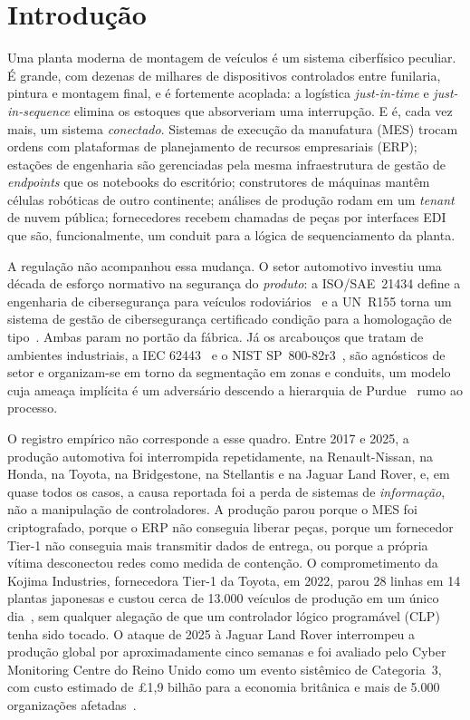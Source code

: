 
\section{Introdução}

Uma planta moderna de montagem de veículos é um sistema ciberfísico peculiar.
É grande, com dezenas de milhares de dispositivos controlados entre funilaria,
pintura e montagem final, e é fortemente acoplada: a logística
\emph{just-in-time} e \emph{just-in-sequence} elimina os estoques que
absorveriam uma interrupção. E é, cada vez mais, um sistema \emph{conectado}.
Sistemas de execução da manufatura (MES) trocam ordens com plataformas de
planejamento de recursos empresariais (ERP); estações de engenharia são
gerenciadas pela mesma infraestrutura de gestão de \emph{endpoints} que os
notebooks do escritório; construtores de máquinas mantêm células robóticas de
outro continente; análises de produção rodam em um \emph{tenant} de nuvem
pública; fornecedores recebem chamadas de peças por interfaces EDI que são,
funcionalmente, um conduit para a lógica de sequenciamento da planta.

A regulação não acompanhou essa mudança. O setor automotivo investiu uma década
de esforço normativo na segurança do \emph{produto}: a ISO/SAE~21434 define a
engenharia de cibersegurança para veículos rodoviários~\cite{isosae21434} e a
UN~R155 torna um sistema de gestão de cibersegurança certificado condição para
a homologação de tipo~\cite{unr155}. Ambas param no portão da fábrica. Já os
arcabouços que tratam de ambientes industriais, a IEC 62443~\cite{iec624433302020,iec624433303} e o
NIST SP~800-82r3~\cite{nist80082r3}, são agnósticos de setor e organizam-se em
torno da segmentação em zonas e conduits, um modelo cuja ameaça implícita é um
adversário descendo a hierarquia de Purdue~\cite{williams1994purdue} rumo ao
processo.

O registro empírico não corresponde a esse quadro. Entre 2017 e 2025, a
produção automotiva foi interrompida repetidamente, na Renault-Nissan, na Honda, na Toyota, na
Bridgestone, na Stellantis e na Jaguar Land Rover, e, em quase todos os casos, a causa reportada foi a perda de sistemas de
\emph{informação}, não a manipulação de controladores. A produção parou porque
o MES foi criptografado, porque o ERP não conseguia liberar peças, porque um
fornecedor Tier-1 não conseguia mais transmitir dados de entrega, ou porque a
própria vítima desconectou redes como medida de contenção. O comprometimento da
Kojima Industries, fornecedora Tier-1 da Toyota, em 2022, parou 28 linhas em 14
plantas japonesas e custou cerca de 13.000 veículos de produção em um único
dia~\cite{inc04toyota,inc04infosec}, sem qualquer alegação de que um controlador
lógico programável (CLP) tenha sido tocado. O ataque de 2025 à Jaguar Land
Rover interrompeu a produção global por aproximadamente cinco semanas e foi
avaliado pelo Cyber Monitoring Centre do Reino Unido como um evento sistêmico
de Categoria~3, com custo estimado de \pounds1,9 bilhão para a economia
britânica e mais de 5.000 organizações afetadas~\cite{inc18cmc,inc18cw}.

